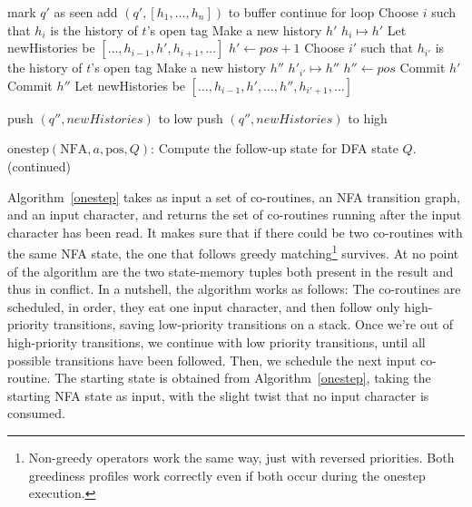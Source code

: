 \documentclass[11pt]{Thesis}
\theoremstyle{definition}
\begin{document}
\begin{algorithm*}
\label{oneStep2}

\ContinuedFloat
\begin{algorithmic}[1]
	\State mark $q'$ as seen
	\State add $(q', [h_{1},\dots,h_{n}])$ to buffer
		 \State continue for loop \EndIf
			\State Choose $i$ such that $h_{i}$ is the history of  $t$'s open tag
			\State Make a new history $h'$
			\State $h_{i} \mapsto h'$ \label{algline:old-copy}
				\State Let newHistories be $[\dots,h_{i-1},h',h_{i+1},\dots]$
				\State $h' \leftarrow pos+1$ \label{algline:store-after}
			\Else
				\State Choose $i'$ such that $h_{i'}$ is the history of  $t$'s open tag 
				\State Make a new history $h''$
				\State $h'_{i'} \mapsto h''$ \label{algline:old-copy2}
				\State $h'' \leftarrow pos$\label{algline:store-current}
				\State Commit $h'$
				\State Commit $h''$
				\State Let newHistories be $[\dots,h_{i-1},h', \dots, h'',h_{i'+1},\dots]$
			\EndIf
		\EndIf		
				
			\State push $(q'', newHistories)$ to low
		\Else
			\State push $(q'', newHistories)$ to high
		\EndIf
	\EndFor
\EndWhile

\caption[]{$\mbox{onestep}(\mbox{NFA}, a, \mbox{pos}, Q)$: Compute the follow-up
state for DFA state $Q$. (continued)}
\end{algorithmic}
\end{algorithm*}


Algorithm~\ref{onestep}  takes as input a set of co-routines, an NFA
transition graph, and an input character, and returns the set of
co-routines running after the input character has been read. It makes
sure that if there could be two co-routines with the same NFA state,
the one that follows greedy matching\footnote{Non-greedy operators
work the same way, just with reversed priorities. Both greediness profiles
work correctly even if both occur during the onestep execution.} survives.
At no point of the algorithm are the two state-memory tuples both present in
the result and thus in conflict. In a nutshell, the algorithm works as follows:
The co-routines are scheduled, in order, they eat one input character, and then
follow only high-priority transitions, saving low-priority transitions on a
stack.  Once we're out of high-priority transitions, we continue with low
priority transitions, until all possible transitions have been followed. Then,
we schedule the next input co-routine.  The starting state is obtained from
Algorithm~\ref{onestep}, taking the starting NFA state as input, with the
slight twist that no input character is consumed.
\end{document}
